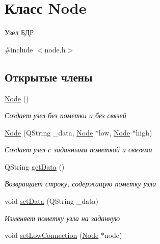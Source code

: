 \hypertarget{class_node}{}\section{Класс Node}
\label{class_node}


Узел БДР  




{\ttfamily \#include $<$node.\+h$>$}

\subsection*{Открытые члены}
\begin{DoxyCompactItemize}
\item 
\hyperlink{class_node_ad7a34779cad45d997bfd6d3d8043c75f}{Node} ()\hypertarget{class_node_ad7a34779cad45d997bfd6d3d8043c75f}{}\label{class_node_ad7a34779cad45d997bfd6d3d8043c75f}

\begin{DoxyCompactList}\small\item\em Создает узел без пометки и без связей \end{DoxyCompactList}\item 
\hyperlink{class_node_a184f393e8d61eea5e10fd6794cbd9c8d}{Node} (Q\+String \+\_\+data, \hyperlink{class_node}{Node} $\ast$low, \hyperlink{class_node}{Node} $\ast$high)
\begin{DoxyCompactList}\small\item\em Создает узел с заданными пометкой и связями \end{DoxyCompactList}\item 
Q\+String \hyperlink{class_node_ab3be314a19ff6049d0ab528ef3122139}{get\+Data} ()\hypertarget{class_node_ab3be314a19ff6049d0ab528ef3122139}{}\label{class_node_ab3be314a19ff6049d0ab528ef3122139}

\begin{DoxyCompactList}\small\item\em Возвращает строку, содержащую пометку узла \end{DoxyCompactList}\item 
void \hyperlink{class_node_a4ec7f6f38e67963aed6759a782db25a1}{set\+Data} (Q\+String \+\_\+data)\hypertarget{class_node_a4ec7f6f38e67963aed6759a782db25a1}{}\label{class_node_a4ec7f6f38e67963aed6759a782db25a1}

\begin{DoxyCompactList}\small\item\em Изменяет пометку узла на заданную \end{DoxyCompactList}\item 
void \hyperlink{class_node_afd304ef1773b4ee5e75e826c4b7b57b0}{set\+Low\+Connection} (\hyperlink{class_node}{Node} $\ast$node)\hypertarget{class_node_afd304ef1773b4ee5e75e826c4b7b57b0}{}\label{class_node_afd304ef1773b4ee5e75e826c4b7b57b0}


\end{DoxyCompactItemize}
